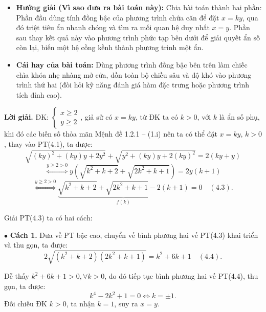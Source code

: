\documentclass[12pt]{report}
\begin{document}
\begin{itemize}
    \item[\textbf{1.}] \textbf{Hướng giải (Vì sao đưa ra bài toán này):} 
    Chia bài toán thành hai phần: Phần đầu dùng tính đồng bậc của phương trình chứa căn để đặt $x = ky$, qua đó triệt tiêu ẩn nhanh chóng và tìm ra mối quan hệ duy nhất $x = y$. Phần sau thay kết quả này vào phương trình phức tạp bên dưới để giải quyết ẩn số còn lại, biến một hệ cồng kềnh thành phương trình một ẩn.

    \item[\textbf{2.}] \textbf{Cái hay của bài toán:} 
    Dùng phương trình đồng bậc bên trên làm chiếc chìa khóa nhẹ nhàng mở cửa, dồn toàn bộ chiều sâu và độ khó vào phương trình thứ hai (đòi hỏi kỹ năng đánh giá hàm đặc trưng hoặc phương trình tích đỉnh cao).
\end{itemize}
\vspace{0.2cm}
\noindent \textbf{Lời giải.} ĐK: $\begin{cases} x \geq 2 \\ y \geq 2 \end{cases}$, giả sử có $x = ky$, từ ĐK ta có $k > 0$, với $k$ là ẩn số phụ, khi đó các biến số thỏa mãn Mệnh đề 1.2.1 -- (1.i) nên ta có thể đặt $x = ky$, $k > 0$, thay vào PT(4.1), ta được:
\[
\sqrt{(ky)^2 + (ky)y + 2y^2} + \sqrt{y^2 + (ky)y + 2(ky)^2} = 2(ky + y)
\]
\[
\overset{y \geq 2 > 0}{\Leftrightarrow} y(\sqrt{k^2 + k + 2} + \sqrt{2k^2 + k + 1}) = 2y(k + 1)
\]
\[
\overset{y \geq 2 > 0}{\Leftrightarrow} \underbrace{\sqrt{k^2 + k + 2} + \sqrt{2k^2 + k + 1} - 2(k + 1)}_{f(k)} = 0 \quad (4.3).
\]

\vspace{0.2cm}
\noindent Giải PT(4.3) ta có hai cách:

\vspace{0.2cm}
\noindent $\bullet$ \textbf{Cách 1.} Đưa về PT bậc cao, chuyển vế bình phương hai vế PT(4.3) khai triển và thu gọn, ta được:
\[
2\sqrt{(k^2 + k + 2)(2k^2 + k + 1)} = k^2 + 6k + 1 \quad (4.4).
\]

Dễ thấy $k^2 + 6k + 1 > 0, \forall k > 0$, do đó tiếp tục bình phương hai vế PT(4.4), thu gọn, ta được:
\[
k^4 - 2k^2 + 1 = 0 \Leftrightarrow k = \pm 1.
\]
Đối chiếu ĐK $k > 0$, ta nhận $k = 1$, suy ra $x = y$.
\end{document}
